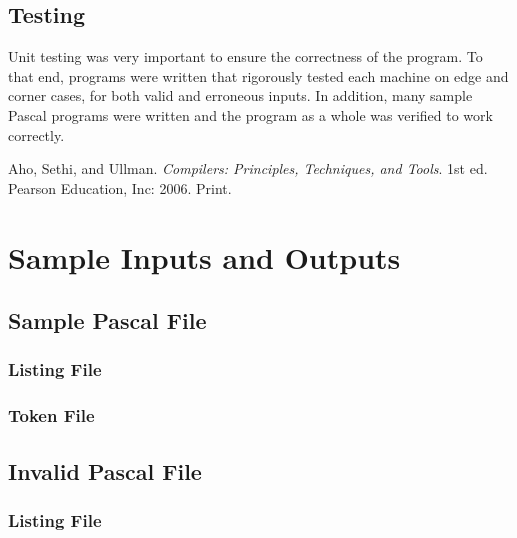 \documentclass[titlepage]{article}
\begin{document}
		\subsection{Testing}
			Unit testing was very important to ensure the correctness of the program. To that end, programs were written that rigorously tested each machine on edge and corner cases, for both valid and erroneous inputs. In addition, many sample Pascal programs were written and the program as a whole was verified to work correctly.
	\begin{thebibliography}{9}
			Aho, Sethi, and Ullman.
			\emph{Compilers: Principles, Techniques, and Tools}.
			1st ed.
			Pearson Education, Inc: 2006. Print.
	\end{thebibliography}
	\appendix
	\clearpage
	\section{Sample Inputs and Outputs}
		\subsection{Sample Pascal File}
		
		\subsubsection{Listing File}
		
		\subsubsection{Token File}
		
		\subsection{Invalid Pascal File}
		
		\subsubsection{Listing File}
		
\end{document}
